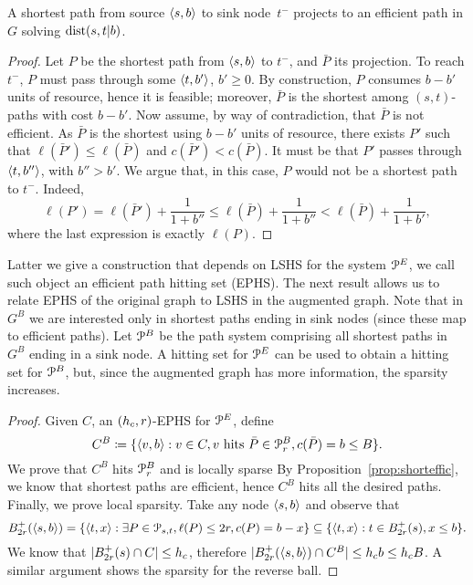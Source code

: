 \begin{proposition}\label{prop:shorteffic}
A shortest path from source $\langle s,b\rangle$ to sink node~$t^-$ projects to an efficient path in $G$ solving $\mbox{dist}(s,t|b)$. 
\end{proposition}
\begin{proof}
Let $P$ be the shortest path from $\langle s,b\rangle$ to $t^-$, and $\bar P$ its projection.
To reach $t^-$, $P$ must pass through some $\langle t,b'\rangle$, $b'\geq 0$.
By construction, $P$ consumes $b-b'$ units of resource, hence it is feasible; moreover, $\bar P$ is the shortest among $(s,t)$-paths with cost $b-b'$.
Now assume, by way of contradiction, that $\bar P$ is not efficient.
As $\bar P$ is the shortest using $b-b'$ units of resource, there exists $P'$ such that $\ell(\bar P')\leq \ell(\bar P)$ and $c(\bar P')< c(\bar P)$.
It must be that $P'$ passes through $\langle t,b''\rangle$, with $b''>b'$.
We argue that, in this case, $P$ would not be a shortest path to $t^-$.
Indeed, 
\[
\ell(P')=\ell(\bar P')+\frac{1}{1+b''}
\leq \ell(\bar P) +\frac{1}{1+b''}
< \ell(\bar P) +\frac{1}{1+b'},
\]
where the last expression is exactly $\ell(P)$.
\end{proof}


Latter we give a construction that depends on LSHS for the system $\mathcal{P}^E$, we call such object an efficient path hitting set (EPHS).
The next result allows us to relate EPHS of the original graph to LSHS in the augmented graph.
Note that in $G^B$ we are interested only in shortest paths ending in sink nodes (since these map to efficient paths). 
Let $\mathcal{P}^B$ be the path system comprising all shortest paths in $G^B$ ending in a sink node.
A hitting set for $\mathcal{P}^E$ can be used to obtain a hitting set for $\mathcal{P}^B$, but, since the augmented graph has more information, the sparsity increases.
 
\begin{proof}
Given $C$, an $(h_c,r)$-EPHS for $\mathcal{P}^E$, define
\begin{equation}\label{eq:hitset}
C^B\coloneqq \{\langle v,b\rangle: v\in C, v \text{ hits }\bar P\in\mathcal{P}^B_r, c(\bar P)=b\leq B \}.
\end{equation}
We prove that $C^B$ hits $\mathcal{P}^B_r$ and is locally sparse
By Proposition~\ref{prop:shorteffic}, we know that shortest paths are efficient, hence $C^B$ hits all the desired paths.
Finally, we prove local sparsity.
Take any node $\langle s,b\rangle$ and observe that
\begin{equation}\label{eq:local_sparsity}
B^+_{2r}(\langle s,b\rangle) = \{\langle t,x\rangle: \exists P\in\mathcal{P}_{s,t}, \ell(P)\leq 2r, c(P)=b-x\} 
\subseteq \{\langle t,x\rangle: t\in B^+_{2r}(s), x\leq b\} . 
\end{equation}
We know that $\lvert B^+_{2r}(s)\cap C\rvert\leq h_c$, therefore $\lvert B^+_{2r}(\langle s,b\rangle)\cap C^B\rvert\leq h_c b\leq h_c B$.
A similar argument shows the sparsity for the reverse ball.
\end{proof}

